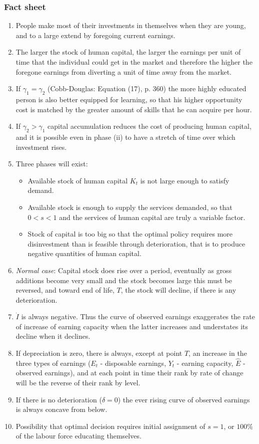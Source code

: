 \documentclass[12pt,a4paper]{article}
\begin{document}
  \subsubsection{Fact sheet} %
  \begin{enumerate}
    \item People make most of their investments in themselves when they are young, and to a large extend by foregoing current earnings.
    \item The larger the stock of human capital, the larger the earnings per unit of time that the individual could get in the market and therefore the higher the foregone earnings from diverting a unit of time away from the market.
    \item If $\gamma _{1} = \gamma _{2}$ (Cobb-Douglas: Equation (17), p. 360) the more highly educated person is also better equipped for learning, so that his higher opportunity cost is matched by the greater amount of skills that he can acquire per hour.
    \item If $\gamma _{2} > \gamma _{1}$ capital accumulation reduces the cost of producing human capital, and it is possible even in phase (ii) to have a stretch of time over which investment rises.
    \item Three phases will exist:
      \begin{itemize}
        \item Available stock of human capital $K_t$ is not large enough to satisfy demand.
        \item Available stock is enough to supply the services demanded, so that $0<s<1$ and the services of human capital are truly a variable factor.
        \item Stock of capital is too big so that the optimal policy requires more disinvestment than is feasible through deterioration, that is to produce negative quantities of human capital.
      \end{itemize}
    \item \emph{Normal case}: Capital stock does rise over a period, eventually as gross additions become very small and the stock becomes large this must be reversed, and toward end of life, $T$, the stock will decline, if there is any deterioration.
    \item $\dot{I}$ is always negative. Thus the curve of observed earnings exaggerates the rate of increase of earning capacity when the latter increases and understates its decline when it declines.
    \item If depreciation is zero, there is always, except at point $T$, an increase in the three types of earnings ($E_t$ - disposable earnings, $Y_t$ - earning capacity, $\hat{E}$ - observed earnings), and at each point in time their rank by rate of change will be the reverse of their rank by level.
    \item If there is no deterioration ($\delta = 0$) the ever rising curve of observed earnings is always concave from below.
    \item Possibility that optimal decision requires initial assignment of $s=1$, or $100\%$ of the labour force educating themselves.
  \end{enumerate}
\end{document}
